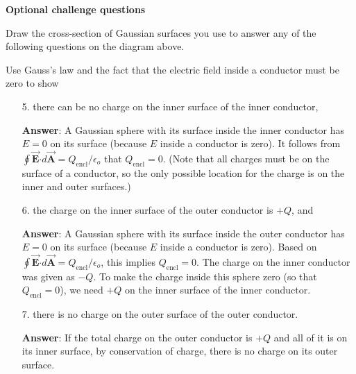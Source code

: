 \documentclass{article}
\newcommand{\bfvec}[1]{\vec{\mathbf{#1}}}
\newcommand{\bfcdot}[0]{\boldsymbol{\cdot}}
\begin{document}
\newpage

\textbf{Optional challenge questions}



Draw the cross-section of Gaussian surfaces you use to answer any of the following questions on the diagram above.

Use Gauss's law and the fact that the electric field inside a conductor must be zero to show

\begin{enumerate}

  \item[5.] there can be no charge on the inner surface of the inner conductor,

            \ifsolutions
            \textbf{Answer}: A Gaussian sphere with its surface inside the inner conductor has $E=0$ on its surface (because $E$ inside a conductor is zero). It follows from $\oint \bfvec{E}\bfcdot d\bfvec{A}=Q_{\text{encl}}/\epsilon_o$ that $Q_{\text{encl}}=0$. (Note that all charges must be on the surface of a conductor, so the only possible location for the charge is on the inner and outer surfaces.)
            \else
            \vskip 120pt
            \fi

  \item[6.] the charge on the inner surface of the outer conductor is $+Q$, and

            \ifsolutions
            \textbf{Answer}: A Gaussian sphere with its surface inside the outer conductor has $E=0$ on its surface (because $E$ inside a conductor is zero). Based on $\oint \bfvec{E}\bfcdot d\mathbf{\bfvec{A}}=Q_{\text{encl}}/\epsilon_o$, this implies $Q_{\text{encl}}=0$. The charge on the inner conductor was given as $-Q$. To make the charge inside this sphere zero (so that $Q_{\text{encl}}=0$), we need $+Q$ on the inner surface of the inner conductor.
            \else
            \vskip 120pt
            \fi

  \item[7.] there is no charge on the outer surface of the outer conductor.

            \ifsolutions
            \textbf{Answer}: If the total charge on the outer conductor is $+Q$ and all of it is on its inner surface, by conservation of charge, there is no charge on its outer surface.
            \else

            \newpage
            \fi

\end{enumerate}
\end{document}
